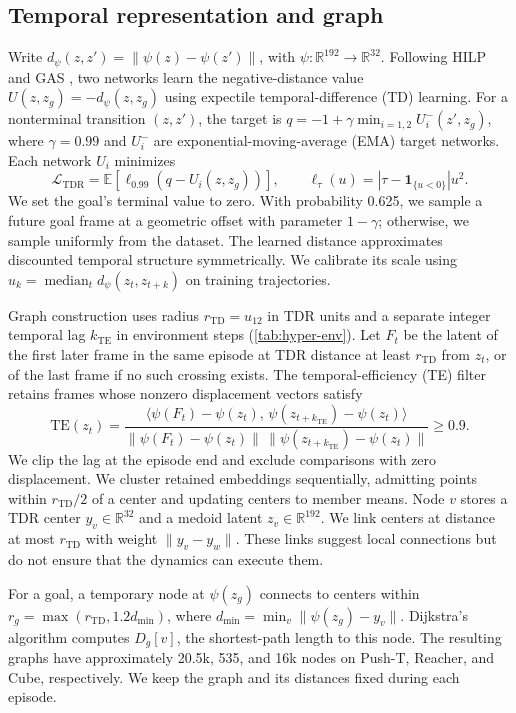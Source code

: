 \documentclass{article} %
\newcommand{\Htd}{r_{\mathrm{TD}}}
\newcommand{\dd}{d_{\psi}}
\newcommand{\ind}{\mathbf{1}}
\newcommand{\EE}{\mathbb E}
\theoremstyle{definition}
\theoremstyle{remark}
\begin{document}
\subsection{Temporal representation and graph}
\label{sec:graph}
Write $\dd(z,z')=\|\psi(z)-\psi(z')\|$, with $\psi:\mathbb R^{192}\to\mathbb R^{32}$.
Following HILP and GAS \citep{hilp,gas}, two networks learn the negative-distance value
$U(z,z_g)=-\dd(z,z_g)$ using expectile temporal-difference (TD) learning. For a nonterminal
transition $(z,z')$, the target is $q=-1+\gamma\min_{i=1,2}U_i^-(z',z_g)$, where $\gamma=0.99$
and $U_i^-$ are exponential-moving-average (EMA) target networks. Each network $U_i$ minimizes
\begin{equation}
 \mathcal L_{\mathrm{TDR}}
 =\EE[\ell_{0.99}(q-U_i(z,z_g))],
 \qquad \ell_\tau(u)=|\tau-\ind_{\{u<0\}}|u^2.
 \label{eq:tdr}
\end{equation}
We set the goal's terminal value to zero. With probability 0.625, we sample a future
goal frame at a geometric offset with parameter $1-\gamma$; otherwise, we sample
uniformly from the dataset. The learned distance approximates discounted temporal
structure symmetrically. We calibrate its scale using $u_k=\operatorname{median}_t\dd(z_t,z_{t+k})$
on training trajectories.

Graph construction uses radius $\Htd=u_{12}$ in TDR units and a separate integer temporal lag
$k_{\mathrm{TE}}$ in environment steps (\cref{tab:hyper-env}). Let $F_t$ be the latent of the
first later frame in the same episode at TDR distance at least $\Htd$ from $z_t$, or of the
last frame if no such crossing exists.
The temporal-efficiency (TE) filter retains frames whose nonzero displacement vectors satisfy
\begin{equation}
 \mathrm{TE}(z_t)=
 \frac{\langle\psi(F_t)-\psi(z_t),\,\psi(z_{t+k_{\mathrm{TE}}})-\psi(z_t)\rangle}
 {\|\psi(F_t)-\psi(z_t)\|\,\|\psi(z_{t+k_{\mathrm{TE}}})-\psi(z_t)\|}
 \ge 0.9 .
 \label{eq:te}
\end{equation}
We clip the lag at the episode end and exclude comparisons with zero displacement.
We cluster retained embeddings sequentially, admitting points within $\Htd/2$ of a center
and updating centers to member means. Node $v$ stores a TDR center $y_v\in\mathbb R^{32}$
and a medoid latent $z_v\in\mathbb R^{192}$.
We link centers at distance at most $\Htd$ with weight $\|y_v-y_w\|$.
These links suggest local connections but do not ensure that the dynamics can execute them.

For a goal, a temporary node at $\psi(z_g)$ connects to centers within
$r_g=\max(\Htd,1.2d_{\min})$, where $d_{\min}=\min_v\|\psi(z_g)-y_v\|$.
Dijkstra's algorithm computes $D_g[v]$, the shortest-path length to this node.
The resulting graphs have approximately 20.5k, 535, and 16k nodes on Push-T, Reacher,
and Cube, respectively. We keep the graph and its distances fixed during each episode.
\end{document}
